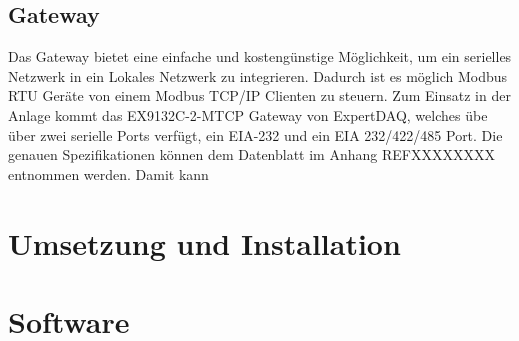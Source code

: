 \subsection{Gateway}
Das Gateway bietet eine einfache und kostengünstige Möglichkeit, um ein serielles Netzwerk in ein Lokales Netzwerk zu integrieren. Dadurch ist es möglich Modbus RTU Geräte von einem Modbus TCP/IP Clienten zu steuern. Zum Einsatz in der Anlage kommt das EX9132C-2-MTCP Gateway von ExpertDAQ, welches übe über zwei serielle Ports verfügt, ein EIA-232 und ein EIA 232/422/485 Port. Die genauen Spezifikationen können dem Datenblatt im Anhang REFXXXXXXXX entnommen werden. Damit kann 

\section{Umsetzung und Installation}

\section{Software}


